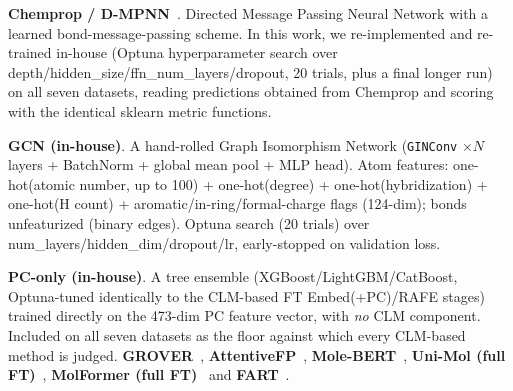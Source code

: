 \documentclass[9pt,a4paper]{article}
\begin{document}
\noindent\textbf{Chemprop / D-MPNN}~\cite{yang2019chemprop}.
Directed Message Passing Neural Network with a learned bond-message-passing scheme.
In this work, we re-implemented and re-trained in-house (Optuna hyperparameter
search over depth/hidden\_size/ffn\_num\_layers/dropout, 20 trials, plus a final
longer run) on all seven datasets, reading predictions obtained from Chemprop and scoring with the identical sklearn metric functions.

\noindent\textbf{GCN (in-house)}.
A hand-rolled Graph Isomorphism Network (\texttt{GINConv} $\times N$ layers +
BatchNorm + global mean pool + MLP head). Atom features: one-hot(atomic number,
up to 100) + one-hot(degree) + one-hot(hybridization) + one-hot(H count) +
aromatic/in-ring/formal-charge flags (124-dim); bonds unfeaturized (binary edges).
Optuna search (20 trials) over num\_layers/hidden\_dim/dropout/lr, early-stopped
on validation loss.

\noindent\textbf{PC-only (in-house)}.
A tree ensemble (XGBoost/LightGBM/CatBoost, Optuna-tuned identically to the
CLM-based FT Embed(+PC)/RAFE stages) trained directly on the 473-dim PC feature
vector, with \emph{no} CLM component. Included on all seven datasets as the floor
against which every CLM-based method is judged. \textbf{GROVER}~\cite{rong2020grover}, \textbf{AttentiveFP}~\cite{xiong2020attentivefp},
\textbf{Mole-BERT}~\cite{xia2023molecbert}, \textbf{Uni-Mol (full FT)}~\cite{zhou2023unimol},
\textbf{MolFormer (full FT)}~\cite{ross2022molformer} and \textbf{FART}~\cite{zimmermann2024fart}.
\end{document}
